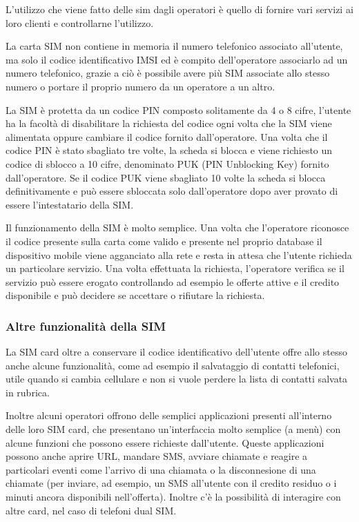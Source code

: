 L'utilizzo che viene fatto delle sim dagli operatori è quello di fornire vari servizi ai loro clienti e controllarne l'utilizzo.

La carta SIM non contiene in memoria il numero telefonico associato all'utente, ma solo il codice identificativo IMSI ed è compito dell'operatore associarlo ad un numero telefonico, grazie a ciò è possibile avere più SIM associate allo stesso numero o portare il proprio numero da un operatore a un altro.

La SIM è protetta da un codice PIN composto solitamente da 4 o 8 cifre, l'utente ha la facoltà di disabilitare la richiesta del codice ogni volta che la SIM viene alimentata oppure cambiare il codice fornito dall'operatore. Una volta che il codice PIN è stato sbagliato tre volte, la scheda si blocca e viene richiesto un codice di sblocco a 10 cifre, denominato PUK (PIN Unblocking Key) fornito dall'operatore. Se il codice PUK viene sbagliato 10 volte la scheda si blocca definitivamente e può essere sbloccata solo dall'operatore dopo aver provato di essere l'intestatario della SIM.

Il funzionamento della SIM è molto semplice. Una volta che l'operatore riconosce il codice presente sulla carta come valido e presente nel proprio database il dispositivo mobile viene agganciato alla rete e resta in attesa che l'utente richieda un particolare servizio. Una volta effettuata la richiesta, l'operatore verifica se il servizio può essere erogato controllando ad esempio le offerte attive e il credito disponibile e può decidere se accettare o rifiutare la richiesta.
\cite{Wiki_sim}

\subsubsection{Altre funzionalità della SIM}
La SIM card oltre a conservare il codice identificativo dell'utente offre allo stesso anche alcune funzionalità, come ad esempio il salvataggio di contatti telefonici, utile quando si cambia cellulare e non si vuole perdere la lista di contatti salvata in rubrica.

Inoltre alcuni operatori offrono delle semplici applicazioni presenti all'interno delle loro SIM card, che presentano un'interfaccia molto semplice (a menù) con alcune funzioni che possono essere richieste dall'utente. Queste applicazioni possono anche aprire URL, mandare SMS, avviare chiamate e reagire a particolari eventi come l'arrivo di una chiamata o la disconnesione di una chiamate (per inviare, ad esempio, un SMS all'utente con il credito residuo o i minuti ancora disponibili nell'offerta). Inoltre c'è la possibilità di interagire con altre card, nel caso di telefoni dual SIM.

